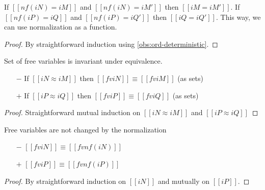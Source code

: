 \begin{observation}
  \label{obs:norm-deterministic}
  If $[[nf(iN) = iM]]$ and $[[nf(iN) = iM']]$ then $[[iM = iM']]$.
  If $[[nf(iP) = iQ]]$ and $[[nf(iP) = iQ']]$ then $[[iQ = iQ']]$.
  This way, we can use normalization as a function.
\end{observation}
\begin{proof}
  By straightforward induction using \cref{obs:ord-deterministic}.
\end{proof}


\begin{lemma}
  \label{lemma:equiv-fv}
  Set of free variables is invariant under equivalence.
  \begin{itemize}
  \item[$-$] If $[[iN ≈ iM]]$ then $[[fv iN]] \equiv [[fv iM]]$ (as sets)
  \item[$+$] If $[[iP ≈ iQ]]$ then $[[fv iP]] \equiv [[fv iQ]]$ (as sets)
  \end{itemize}
\end{lemma}
\begin{proof}
  Straightforward mutual induction on $[[iN ≈ iM]]$ and $[[iP ≈ iQ]]$
\end{proof}


\begin{lemma}
  \label{lemma:fv-nf}
  Free variables are not changed by the normalization
  \begin{itemize}
  \item[$-$] $[[fv iN]] \equiv [[fv nf(iN)]]$
  \item[$+$] $[[fv iP]] \equiv [[fv nf(iP)]]$
  \end{itemize}
\end{lemma}
\begin{proof}
  By straightforward induction on $[[iN]]$ and mutually on $[[iP]]$.
\end{proof}


